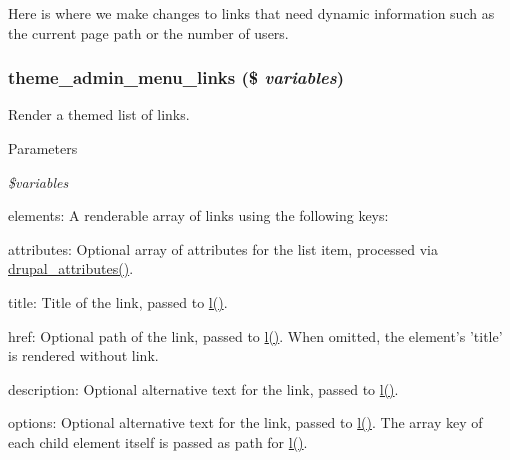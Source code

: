 Here is where we make changes to links that need dynamic information such as the current page path or the number of users. \hypertarget{admin__menu_8module_a33d1120bbd0ebf32f21f44c17b831475}{
\subsubsection[{theme\_\-admin\_\-menu\_\-links}]{\setlength{\rightskip}{0pt plus 5cm}theme\_\-admin\_\-menu\_\-links (\$ {\em variables})}}
\label{admin__menu_8module_a33d1120bbd0ebf32f21f44c17b831475}
Render a themed list of links.


\begin{DoxyParams}{Parameters}
\item[{\em \$variables}]
\begin{DoxyItemize}
\item elements: A renderable array of links using the following keys:
\begin{DoxyItemize}
\item attributes: Optional array of attributes for the list item, processed via \hyperlink{group__sanitization_gacf11629fb3d1ebf200863e2d15380b4a}{drupal\_\-attributes()}.
\item title: Title of the link, passed to \hyperlink{common_8inc_ad3b36c06dc46250b8d22b8d0d2e7bd97}{l()}.
\item href: Optional path of the link, passed to \hyperlink{common_8inc_ad3b36c06dc46250b8d22b8d0d2e7bd97}{l()}. When omitted, the element's 'title' is rendered without link.
\item description: Optional alternative text for the link, passed to \hyperlink{common_8inc_ad3b36c06dc46250b8d22b8d0d2e7bd97}{l()}.
\item options: Optional alternative text for the link, passed to \hyperlink{common_8inc_ad3b36c06dc46250b8d22b8d0d2e7bd97}{l()}. The array key of each child element itself is passed as path for \hyperlink{common_8inc_ad3b36c06dc46250b8d22b8d0d2e7bd97}{l()}. 
\end{DoxyItemize}
\end{DoxyItemize}\end{DoxyParams}
